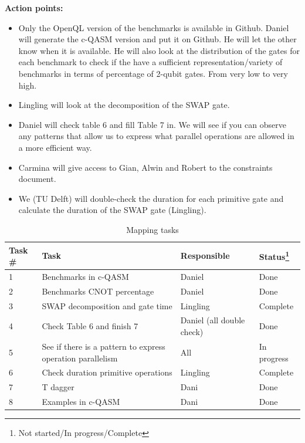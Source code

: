\documentclass[11pt]{article}
\begin{document}
\textbf{Action points:}

\begin{itemize}

    \item Only the OpenQL version of the benchmarks is available in Github. Daniel will generate the c-QASM version and put it on Github. He will let the other know when it is available. He will also look at the distribution of the gates for each benchmark to check if the have a sufficient representation/variety of benchmarks in terms of percentage of 2-qubit gates. From very low to very high.
    
    \item Lingling will look at the decomposition of the SWAP gate.
    
    \item Daniel will check table 6 and fill Table 7 in. We will see if you can observe any patterns that allow us to express what parallel operations are allowed in a more efficient way.
    
    \item Carmina will give access to Gian, Alwin and Robert to the constraints document.
    
    \item We (TU Delft) will double-check the duration for each primitive gate and calculate the duration of the SWAP gate (Lingling). 
    
    \end{itemize}
    
    
    
\begin{table}[!h]
\centering
\scriptsize
\caption{Mapping tasks}
\label{tab:openql-overview}
\begin{minipage}[c]{\linewidth}
\begin{tabular}{llll}
\toprule
Task \# & Task & Responsible  & Status\footnote{\scriptsize Not started/In progress/Complete} \\
\midrule
 1 & Benchmarks in c-QASM                          & Daniel    & Done  \\
 2 & Benchmarks CNOT percentage                    & Daniel         & Done      \\
 3 & SWAP decomposition and gate time             & Lingling        & Complete     \\
 4 & Check Table 6 and finish 7                  & Daniel (all double check)          & Done       \\
 5 & See if there is a pattern to express operation parallelism                 & All          & In progress     \\
 6 & Check duration primitive operations                 & Lingling         & Complete      \\
  7 & T dagger                 & Dani         & Done     \\
  8 & Examples in c-QASM                 & Dani         & Done      \\


\bottomrule
\end{tabular}
\end{minipage}
\end{table}    
    
\end{document}
